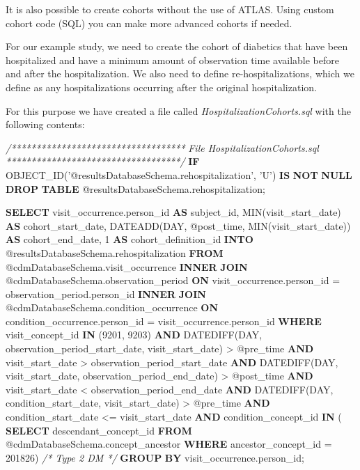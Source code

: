 \documentclass[]{article}
\newenvironment{Shaded}{\begin{snugshade}}{\end{snugshade}}
\newcommand{\KeywordTok}[1]{\textcolor[rgb]{0.13,0.29,0.53}{\textbf{#1}}}
\newcommand{\DataTypeTok}[1]{\textcolor[rgb]{0.13,0.29,0.53}{#1}}
\newcommand{\DecValTok}[1]{\textcolor[rgb]{0.00,0.00,0.81}{#1}}
\newcommand{\StringTok}[1]{\textcolor[rgb]{0.31,0.60,0.02}{#1}}
\newcommand{\CommentTok}[1]{\textcolor[rgb]{0.56,0.35,0.01}{\textit{#1}}}
\newcommand{\FunctionTok}[1]{\textcolor[rgb]{0.00,0.00,0.00}{#1}}
\newcommand{\NormalTok}[1]{#1}
\begin{document}
It is also possible to create cohorts without the use of ATLAS. Using
custom cohort code (SQL) you can make more advanced cohorts if needed.

For our example study, we need to create the cohort of diabetics that
have been hospitalized and have a minimum amount of observation time
available before and after the hospitalization. We also need to define
re-hospitalizations, which we define as any hospitalizations occurring
after the original hospitalization.

For this purpose we have created a file called
\emph{HospitalizationCohorts.sql} with the following contents:

\begin{Shaded}
\begin{Highlighting}[]
\CommentTok{/***********************************}
\CommentTok{File HospitalizationCohorts.sql }
\CommentTok{***********************************/}
\KeywordTok{IF}\NormalTok{ OBJECT_ID(}\StringTok{'@resultsDatabaseSchema.rehospitalization'}\NormalTok{, }\StringTok{'U'}\NormalTok{) }\KeywordTok{IS} \KeywordTok{NOT} \KeywordTok{NULL}
\KeywordTok{DROP} \KeywordTok{TABLE}\NormalTok{ @resultsDatabaseSchema.rehospitalization;}

\KeywordTok{SELECT}\NormalTok{ visit_occurrence.person_id }\KeywordTok{AS}\NormalTok{ subject_id,}
\FunctionTok{MIN}\NormalTok{(visit_start_date) }\KeywordTok{AS}\NormalTok{ cohort_start_date,}
\NormalTok{DATEADD(}\DataTypeTok{DAY}\NormalTok{, @post_time, }\FunctionTok{MIN}\NormalTok{(visit_start_date)) }\KeywordTok{AS}\NormalTok{ cohort_end_date,}
\DecValTok{1} \KeywordTok{AS}\NormalTok{ cohort_definition_id}
\KeywordTok{INTO}\NormalTok{ @resultsDatabaseSchema.rehospitalization}
\KeywordTok{FROM}\NormalTok{ @cdmDatabaseSchema.visit_occurrence}
\KeywordTok{INNER} \KeywordTok{JOIN}\NormalTok{ @cdmDatabaseSchema.observation_period}
\KeywordTok{ON}\NormalTok{ visit_occurrence.person_id = observation_period.person_id}
\KeywordTok{INNER} \KeywordTok{JOIN}\NormalTok{ @cdmDatabaseSchema.condition_occurrence}
\KeywordTok{ON}\NormalTok{ condition_occurrence.person_id = visit_occurrence.person_id }
\KeywordTok{WHERE}\NormalTok{ visit_concept_id }\KeywordTok{IN}\NormalTok{ (}\DecValTok{9201}\NormalTok{, }\DecValTok{9203}\NormalTok{)}
\KeywordTok{AND}\NormalTok{ DATEDIFF(}\DataTypeTok{DAY}\NormalTok{, observation_period_start_date, visit_start_date) > @pre_time}
\KeywordTok{AND}\NormalTok{ visit_start_date > observation_period_start_date}
\KeywordTok{AND}\NormalTok{ DATEDIFF(}\DataTypeTok{DAY}\NormalTok{, visit_start_date, observation_period_end_date) > @post_time}
\KeywordTok{AND}\NormalTok{ visit_start_date < observation_period_end_date}
\KeywordTok{AND}\NormalTok{ DATEDIFF(}\DataTypeTok{DAY}\NormalTok{, condition_start_date, visit_start_date) > @pre_time}
\KeywordTok{AND}\NormalTok{ condition_start_date <= visit_start_date}
\KeywordTok{AND}\NormalTok{ condition_concept_id }\KeywordTok{IN}\NormalTok{ (}
\KeywordTok{SELECT}\NormalTok{ descendant_concept_id }
\KeywordTok{FROM}\NormalTok{ @cdmDatabaseSchema.concept_ancestor }
\KeywordTok{WHERE}\NormalTok{ ancestor_concept_id = }\DecValTok{201826}\NormalTok{) }\CommentTok{/* Type 2 DM */}
\KeywordTok{GROUP} \KeywordTok{BY}\NormalTok{ visit_occurrence.person_id;}


\end{Highlighting}
\end{Shaded}
\end{document}

